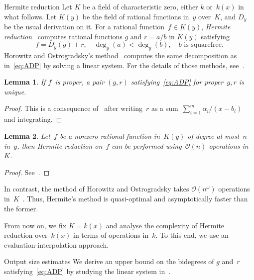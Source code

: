 \documentclass{sig-alt-full}
\newcommand{\bigO}{{\mathcal{O}}}
\newcommand{\bigOsoft}{\tilde{\mathcal{O}}}
\newtheorem{lemma}{Lemma}
\begin{document}
\begin{section}{Hermite reduction}\label{sec:Hermite-reduction}
Let $K$ be a field of characteristic zero, either $k$ or~$k(x)$ in
what follows. Let $K(y)$ be the field of rational functions in~$y$
over~$K$, and $D_y$ be the usual derivation on it. For a rational
function~$f\in K(y)$, \emph{Hermite reduction\/}~\cite{Hermite1872}
computes rational functions $g$ and  $r=a/b$ in $K(y)$ satisfying
\begin{equation}\label{eq:ADP}
f = D_y(g) + r, \quad\deg_y(a)<\deg_y(b), \quad\text{$b$~is squarefree.}
\end{equation}
Horowitz and Ostrogradsky's method~\cite{Ostrogradsky1845,
Horowitz1971} computes the same decomposition as in~\eqref{eq:ADP}
by solving a linear system. For the details of those methods,
see~\cite[Chapter 2]{BronsteinBook}.
\begin{lemma}\label{le:unique}
If $f$~is proper, a pair $(g, r)$ satisfying~\eqref{eq:ADP} for
proper~$g,r$ is unique.
\end{lemma}
\begin{proof}
This is a consequence of~\cite[Theorem~2.10]{Horowitz1971} after
writing~$r$ as a sum~$\sum_{i=1}^m\alpha_i/(x-b_i)$ and integrating.
\end{proof}
\begin{lemma}\label{le:ComplexityUHR}
Let~$f$ be a nonzero rational function in~$K(y)$ of degree at most~$n$ in~$y$,
then Hermite reduction on~$f$ can
be performed using~$\bigOsoft(n)$ operations in~$K$.
\end{lemma}
\begin{proof}
See~\cite[Theorem 22.7]{MCA2003}.
\end{proof}
In contrast, the method of Horowitz and Ostrogradsky takes
$\bigO(n^\omega)$ operations in~$K$~\cite[\S\,22.2]{MCA2003}. Thus,
Hermite's method is quasi-optimal and asymptotically faster than the
former.

From now on, we fix $K=k(x)$ and analyse the complexity
of
Hermite reduction over~$k(x)$ in terms of
operations in~$k$.
To this end, we use an evaluation-interpolation approach.

\begin{subsection}{Output size estimates}
We derive an upper bound on the bidegrees of $g$ and~$r$
satisfying~\eqref{eq:ADP} by studying the linear system
in~\cite{Horowitz1971}.


\end{subsection}
\end{section}
\end{document}
